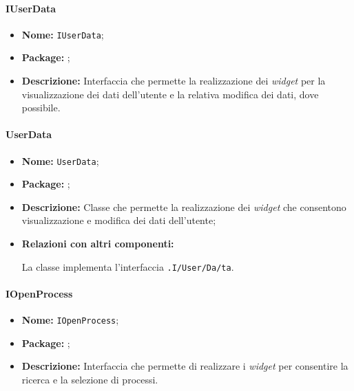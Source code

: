 \paragraph{IUserData}
\begin{itemize}
\item \textbf{Nome:} \texttt{IUserData};
\item \textbf{Package:} \texttt{\viewUser{}};
\item \textbf{Descrizione:} Interfaccia che permette la realizzazione dei \textit{widget} per la visualizzazione dei dati dell'utente e la relativa modifica dei dati, dove possibile.
\end{itemize}

\paragraph{UserData}
\begin{flushleft}
\begin{itemize}
\item \textbf{Nome:} \texttt{UserData};
\item \textbf{Package:} \texttt{\viewUser{}};
\item \textbf{Descrizione:} Classe che permette la realizzazione dei \textit{widget} che consentono visualizzazione e modifica dei dati dell'utente;
\item \textbf{Relazioni con altri componenti:}
\begin{sloppypar}
La classe implementa l'interfaccia \texttt{\viewUser{}.I\fshyp{}User\fshyp{}Da\fshyp{}ta}.
\end{sloppypar}
\end{itemize}
\end{flushleft}

\paragraph{IOpenProcess}
\begin{itemize}
\item \textbf{Nome:} \texttt{IOpenProcess};
\item \textbf{Package:} \texttt{\viewUser{}};
\item \textbf{Descrizione:} Interfaccia che permette di realizzare i \textit{widget} per consentire la ricerca e la selezione di processi.
\end{itemize}

